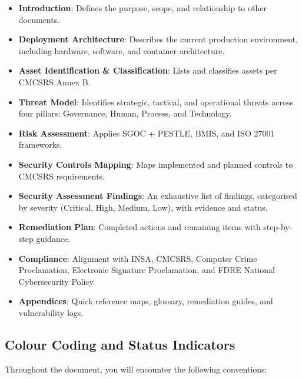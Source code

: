 \begin{itemize}
    \item \textbf{Introduction}: Defines the purpose, scope, and relationship to other documents.
    \item \textbf{Deployment Architecture}: Describes the current production environment, including hardware, software, and container architecture.
    \item \textbf{Asset Identification \& Classification}: Lists and classifies assets per CMCSRS Annex B.
    \item \textbf{Threat Model}: Identifies strategic, tactical, and operational threats across four pillars: Governance, Human, Process, and Technology.
    \item \textbf{Risk Assessment}: Applies SGOC + PESTLE, BMIS, and ISO 27001 frameworks.
    \item \textbf{Security Controls Mapping}: Maps implemented and planned controls to CMCSRS requirements.
    \item \textbf{Security Assessment Findings}: An exhaustive list of findings, categorised by severity (Critical, High, Medium, Low), with evidence and status.
    \item \textbf{Remediation Plan}: Completed actions and remaining items with step-by-step guidance.
    \item \textbf{Compliance}: Alignment with INSA, CMCSRS, Computer Crime Proclamation, Electronic Signature Proclamation, and FDRE National Cybersecurity Policy.
    \item \textbf{Appendices}: Quick reference maps, glossary, remediation guides, and vulnerability logs.
\end{itemize}

\subsection*{Colour Coding and Status Indicators}

Throughout the document, you will encounter the following conventions:


